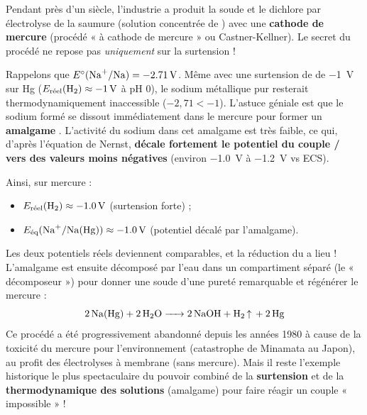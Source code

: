 \documentclass[11pt]{article}
\begin{document}
\begin{savaistu}
Pendant près d'un siècle, l'industrie a produit la soude  et le dichlore  par électrolyse de la saumure (solution concentrée de ) avec une \textbf{cathode de mercure} (procédé « à cathode de mercure » ou Castner-Kellner). Le secret du procédé ne repose pas \emph{uniquement} sur la surtension !

Rappelons que $E^{\circ}(\ce{Na+}/\ce{Na}) = \SI{-2,71}{V}$. Même avec une surtension de  de \SI{-1}{V} sur Hg ($E_{\text{réel}}(\ce{H2}) \approx \SI{-1}{V}$ à pH 0), le sodium métallique pur resterait thermodynamiquement inaccessible ($-2,71 < -1$). L'astuce géniale est que le sodium formé se dissout immédiatement dans le mercure pour former un \textbf{amalgame} . L'activité du sodium dans cet amalgame est très faible, ce qui, d'après l'équation de Nernst, \textbf{décale fortement le potentiel du couple / vers des valeurs moins négatives} (environ \SI{-1,0}{V} à \SI{-1,2}{V} vs ECS).

Ainsi, sur mercure :
\begin{itemize}
\item $E_{\text{réel}}(\ce{H2}) \approx \SI{-1,0}{V}$ (surtension forte) ;
\item $E_{\text{éq}}(\ce{Na+}/\ce{Na(Hg)}) \approx \SI{-1,0}{V}$ (potentiel décalé par l'amalgame).
\end{itemize}
Les deux potentiels réels deviennent comparables, et la réduction du  a lieu ! L'amalgame  est ensuite décomposé par l'eau dans un compartiment séparé (le « décomposeur ») pour donner une soude d'une pureté remarquable et régénérer le mercure :
\[ \ce{2 Na(Hg) + 2 H2O -> 2 NaOH + H2 ^ + 2 Hg} \]
Ce procédé a été progressivement abandonné depuis les années 1980 à cause de la toxicité du mercure pour l'environnement (catastrophe de Minamata au Japon), au profit des électrolyses à membrane (sans mercure). Mais il reste l'exemple historique le plus spectaculaire du pouvoir combiné de la \textbf{surtension} et de la \textbf{thermodynamique des solutions} (amalgame) pour faire réagir un couple « impossible » !
\end{savaistu}
\end{document}
